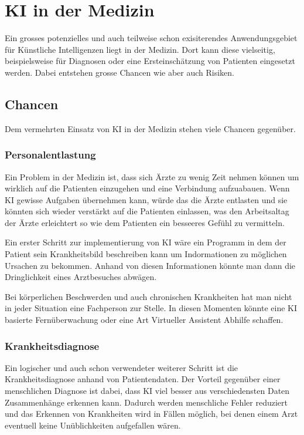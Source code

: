 \chapter{KI in der Medizin}
\label{chap:ai-medicine}

Ein grosses potenzielles und auch teilweise schon exisiterendes Anwendungsgebiet für Künstliche Intelligenzen liegt in der Medizin.
Dort kann diese vielseitig, beispielsweise für Diagnosen oder eine Ersteinschätzung von Patienten eingesetzt werden.
\noindent
Dabei entstehen grosse Chancen wie aber auch Risiken.

\section{Chancen}
Dem vermehrten Einsatz von KI in der Medizin stehen viele Chancen gegenüber.

\subsection{\normalsize{Personalentlastung}}
Ein Problem in der Medizin ist, dass sich Ärzte zu wenig Zeit nehmen können um wirklich auf die Patienten einzugehen und eine Verbindung aufzuabauen.
Wenn KI gewisse Aufgaben übernehmen kann, würde das die Ärzte entlasten und sie könnten sich wieder verstärkt auf die Patienten einlassen, was den Arbeitsaltag der Ärzte erleichtert so wie dem Patienten ein besseeres Gefühl zu vermitteln.

Ein erster Schritt zur implementierung von KI wäre ein Programm in dem der Patient sein Krankheitsbild beschreiben kann um Indormationen zu möglichen Ursachen zu bekommen. Anhand von diesen Informationen könnte man dann die Dringlichkeit eines Arztbesuches abwägen.

Bei körperlichen Beschwerden und auch chronischen Krankheiten hat man nicht in jeder Situation eine Fachperson zur Stelle. In diesen Momenten könnte eine KI basierte Fernüberwachung oder eine Art Virtueller Assistent Abhilfe schaffen.

\subsection{\normalsize{Krankheitsdiagnose}}
Ein logischer und auch schon verwendeter weiterer Schritt ist die Krankheitsdiagnose anhand von Patientendaten. 
Der Vorteil gegenüber einer menschlichen Diagnose ist dabei, dass KI viel besser aus verschiedensten Daten Zusammenhänge erkennen kann. 
Dadurch werden menschliche Fehler reduziert und das Erkennen von Krankheiten wird in Fällen möglich, bei denen einem Arzt eventuell keine Unüblichkeiten aufgefallen wären.

